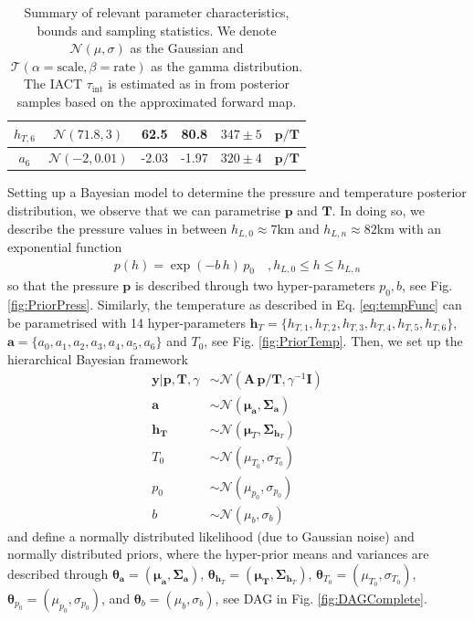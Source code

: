 \begin{table}
\begin{tabular}{ |c||c|c|c|c|c|   }
		$h_{T,6}$ &  $\mathcal{N}(71.8,3)$&62.5 &80.8&$347 \pm 5$&$\bm{p/T}$\\ \hline
		$a_{6}$ & $\mathcal{N}(-2,0.01)$ &-2.03 &-1.97&$320 \pm 4$&$\bm{p/T}$\\
		\hline
	\end{tabular}
	\caption[Summary of relevant parameter characteristics, bounds and sampling statistics.]{Summary of relevant parameter characteristics, bounds and sampling statistics. We denote $\mathcal{N}(\mu,\sigma)$ as the Gaussian and $\mathcal{T}(\alpha = \text{scale}, \beta = \text{rate})$ as the gamma distribution. The IACT $\tau_{\text{int}}$ is estimated as in \cite{UwerrM} from posterior samples based on the approximated forward map.}
	\label{tab:priors}
\end{table}

Setting up a Bayesian model to determine the pressure and temperature posterior distribution, we observe that we can parametrise $\bm{p}$ and $\bm{T}$.
In doing so, we describe the pressure values in between $h_{L,0} \approx 7$km and $h_{L,n} \approx 82$km with an exponential function
\begin{align}
	p(h) =
	\exp \left( -b \, h \right)   \,  p_0 \quad ,h_{L,0}  \leq h \leq h_{L,n}
	\label{eq:pressFunc}
\end{align}
so that the pressure $\bm{p}$ is described through two hyper-parameters $p_0,b$, see Fig. \ref{fig:PriorPress}.
Similarly, the temperature as described in Eq. \ref{eq:tempFunc} can be parametrised with 14 hyper-parameters  $\bm{h}_T = \{ h_{T,1}, h_{T,2},h_{T,3},h_{T,4},h_{T,5},h_{T,6} \}$, $\bm{a} = \{a_0, a_1, a_2,a_3,a_4,a_5,a_6 \} $ and $T_0$, see Fig. \ref{fig:PriorTemp}.
Then, we set up the hierarchical Bayesian framework
\begin{subequations}
	\begin{align}
		\bm{y} |  \bm{p}, \bm{T}, \gamma &\sim \mathcal{N}(\bm{A} \, \bm{p}/\bm{T}, \gamma^{-1} \bm{I}) \label{eq:likelihoodPT} \\
		\bm{a}  &\sim \mathcal{N}(\bm{\mu}_{\bm{a}}, \bm{\Sigma}_{\bm{a}})\\
		\bm{h}_{\bm{T}}  &\sim \mathcal{N}(\bm{\mu}_{T}, \bm{\Sigma}_{\bm{h}_T}) \\
		T_0  &\sim \mathcal{N}(\mu_{T_0}, \sigma_{T_0} )\\
		p_0  &\sim \mathcal{N}(\mu_{p_0}, \sigma_{p_0} )\\
		b  &\sim \mathcal{N}(\mu_b, \sigma_b )
	\end{align}
	\label{eq:BayMode}
\end{subequations}
and define a normally distributed likelihood (due to Gaussian noise) and normally distributed priors, where the hyper-prior means and variances are described through $\bm{\theta}_{\bm{a}} =(\bm{\mu}_{\bm{a}}, \bm{\Sigma}_{\bm{a}})$, $\bm{\theta}_{\bm{h}_T} = (\bm{\mu}_{\bm{T}}, \bm{\Sigma}_{\bm{h}_T}) $, 
$\bm{\theta}_{T_0} = (\mu_{T_0}, \sigma_{T_0})$, $\bm{\theta}_{p_0} = (\mu_{p_0}, \sigma_{p_0})$, and $\bm{\theta}_{b} = (\mu_{b}, \sigma_{b})$, see DAG in Fig. \ref{fig:DAGComplete}.


